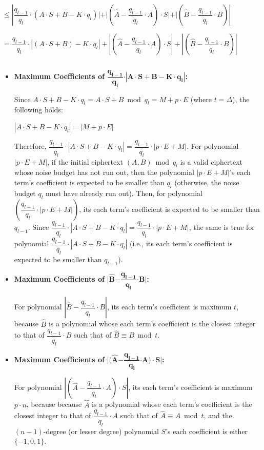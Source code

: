 \begin{myproof}
\begin{enumerate}
$\leq \left|\dfrac{q_{l-1}}{q_l}\cdot(A\cdot S+ B - K\cdot q_l)| + |(\hat A - \dfrac{q_{l-1}}{q_l}\cdot A)\cdot S| + |(\hat B - \dfrac{q_{l-1}}{q_l}\cdot B)\right|$

$= \dfrac{q_{l-1}}{q_l}\cdot |(A\cdot S+ B) - K\cdot q_l| + \left|(\hat A - \dfrac{q_{l-1}}{q_l}\cdot A)\cdot S\right| + \left|(\hat B - \dfrac{q_{l-1}}{q_l}\cdot B)\right|$

$ $

\begin{itemize}
\item \textbf{Maximum Coefficients of } $\dfrac{\bm{q_{l-1}}}{\bm{q_l}} \bm{\cdot \left|A\cdot S + B - K\cdot q_l\right|}$\textbf{:} 

Since $A\cdot S + B - K\cdot q_l = A\cdot S + B \bmod q_l = M + p\cdot E$ (where $t = \Delta$), the following holds:

$|A\cdot S + B - K\cdot q_l| = |M + p\cdot E|$ 

Therefore, $\dfrac{q_{l-1}}{q_l}\cdot |A\cdot S + B - K\cdot q_l| = \dfrac{q_{l-1}}{q_l}\cdot |p\cdot E + M|$. For polynomial $|p\cdot E + M|$, if the initial ciphertext $(A, B) \bmod q_l$ is a valid ciphertext whose noise budget has not run out, then the polynomial $|p\cdot E + M|$'s each term's coefficient is expected to be smaller than $q_l$ (otherwise, the noise budget $q_{l}$ must have already run out). Then, for polynomial $(\dfrac{q_{l-1}}{q_l}\cdot |p\cdot E + M|)$, its each term's coefficient is expected to be smaller than $q_{l-1}$. Since $\dfrac{q_{l-1}}{q_l}\cdot |A\cdot S + B - K\cdot q_l| = \dfrac{q_{l-1}}{q_l}\cdot |p\cdot E + M|$, the same is true for polynomial $\dfrac{q_{l-1}}{q_l}\cdot |A\cdot S + B - K\cdot q_l|$ (i.e., its each term's coefficient is expected to be smaller than $q_{l-1}$).
\item \textbf{Maximum Coefficients of } $\bm|\bm{\hat{B}} \bm{-} \dfrac{\bm{q_{l-1}}}{\bm{q_l}}\bm{\cdot B|}$\textbf{:} 

For polynomial $\left|\hat B - \dfrac{q_{l-1}}{q_l}\cdot B\right|$, its each term's coefficient is maximum $t$, because $\hat B$ is a polynomial whose each term's coefficient is the closest integer to that of $\dfrac{q_{l-1}}{q_l}\cdot B$ such that of $\hat B \equiv B \bmod t$.

\item \textbf{Maximum Coefficients of } $\bm|\bm(\bm{\hat{A}} \bm- \dfrac{\bm{q_{l-1}}}{\bm{q_l}}\bm{\cdot A)\cdot S|}$\textbf{:}

For polynomial $|(\hat A - \dfrac{q_{l-1}}{q_l}\cdot A)\cdot S|$, its each term's coefficient is maximum $p\cdot n$, because because $\hat A$ is a polynomial whose each term's coefficient is the closest integer to that of $\dfrac{q_{l-1}}{q_l}\cdot A$ such that of $\hat A \equiv A \bmod t$, and the $(n-1)$-degree (or lesser degree) polynomial $S$'s each coefficient is either $\{-1, 0, 1\}$.
\end{itemize}


\end{enumerate}
\end{myproof}
